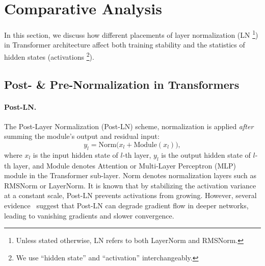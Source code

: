 \section{Comparative Analysis} \label{sec:ln_in_transformer}

In this section, we discuss how different placements of layer normalization (LN \footnote{Unless stated otherwise, LN refers to both LayerNorm and RMSNorm.}) in Transformer architecture affect both training stability and the statistics of hidden states (activations \footnote{We use ``hidden state'' and ``activation'' interchangeably.}).

\subsection{Post- \& Pre-Normalization in Transformers}
\label{subsec:post_pre_ln}
\paragraph{Post-LN.}
The Post-Layer Normalization (Post-LN) \citep{attentionisallyouneed} scheme, normalization is applied \emph{after} summing the module’s output and residual input:
\begin{equation}
    y_{l} = \mathrm{Norm}\bigl(x_l + \mathrm{Module}(x_l)\bigr),
    \label{eq:post_ln}
\end{equation}
where $x_l$ is the input hidden state of $l$-th layer, $y_{l}$ is the output hidden state of $l$-th layer, and $\mathrm{Module}$ denotes Attention or Multi-Layer Perceptron (MLP) module in the Transformer sub-layer. $\mathrm{Norm}$ denotes normalization layers such as RMSNorm or LayerNorm. It is known that by stabilizing the activation variance at a constant scale, Post-LN prevents activations from growing. However, several evidence~\citep{onlayer, transformersgetstable} suggest that Post-LN can degrade gradient flow in deeper networks, leading to vanishing gradients and slower convergence.


